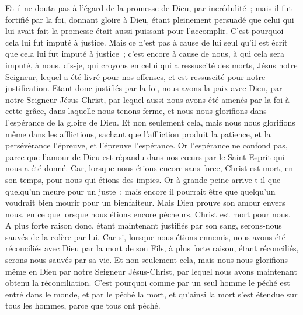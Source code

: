 \begin{multicols}{2}
Et il ne douta pas à l'égard de la promesse de Dieu, par incrédulité~; mais il fut fortifié par la foi, donnant gloire à Dieu,
étant pleinement persuadé que celui qui lui avait fait la promesse était aussi puissant pour l'accomplir.
C'est pourquoi cela lui fut imputé à justice.
Mais ce n'est pas à cause de lui seul qu'il est écrit que cela lui fut imputé à justice~;
c'est encore à cause de nous, à qui cela sera imputé, à nous, dis-je, qui croyons en celui qui a ressuscité des morts, Jésus notre Seigneur,
lequel a été livré pour nos offenses, et est ressuscité pour notre justification.
\VerseOne{}Etant donc justifiés par la foi, nous avons la paix avec Dieu, par notre Seigneur Jésus-Christ,
par lequel aussi nous avons été amenés par la foi à cette grâce, dans laquelle nous tenons ferme, et nous nous glorifions dans l'espérance de la gloire de Dieu.
Et non seulement cela, mais nous nous glorifions même dans les afflictions, sachant que l'affliction produit la patience,
et la persévérance l'épreuve, et l'épreuve l'espérance.
Or l'espérance ne confond pas, parce que l'amour de Dieu est répandu dans nos cœurs par le Saint-Esprit qui nous a été donné.
Car, lorsque nous étions encore sans force, Christ est mort, en son temps, pour nous qui étions des impies.
Or à grande peine arrive-t-il que quelqu'un meure pour un juste~; mais encore il pourrait être que quelqu'un voudrait bien mourir pour un bienfaiteur.
Mais Dieu prouve son amour envers nous, en ce que lorsque nous étions encore pécheurs, Christ est mort pour nous.
A plus forte raison donc, étant maintenant justifiés par son sang, serons-nous sauvés de la colère par lui.
Car si, lorsque nous étions ennemis, nous avons été réconciliés avec Dieu par la mort de son Fils, à plus forte raison, étant réconciliés, serons-nous sauvés par sa vie.
Et non seulement cela, mais nous nous glorifions même en Dieu par notre Seigneur Jésus-Christ, par lequel nous avons maintenant obtenu la réconciliation.
C'est pourquoi comme par un seul homme le péché est entré dans le monde, et par le péché la mort, et qu'ainsi la mort s'est étendue sur tous les hommes, parce que tous ont péché.

\end{multicols}
